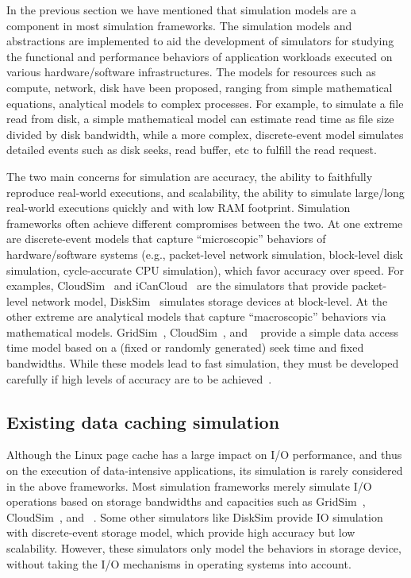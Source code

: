 In the previous section we have mentioned that simulation models are 
a component in most simulation frameworks.
The simulation models and abstractions are implemented to aid the 
development of simulators for studying the functional and performance 
behaviors of application workloads executed on various 
hardware/software infrastructures. 
The models for resources such as compute, network, disk have been proposed, 
ranging from simple mathematical equations, analytical models 
to complex processes.
For example, to simulate a file read from disk, a simple mathematical model 
can estimate read time as file size divided by disk bandwidth, 
while a more complex, discrete-event model simulates detailed events 
such as disk seeks, read buffer, etc to fulfill the read request.

The two main concerns for simulation are accuracy, the ability to 
faithfully reproduce real-world executions, and scalability, 
the ability to simulate large/long real-world executions quickly 
and with low RAM footprint. 
Simulation frameworks often achieve different compromises between the two.  
At one extreme are discrete-event models that capture
``microscopic'' behaviors of hardware/software systems (e.g.,
packet-level network simulation, block-level disk simulation,
cycle-accurate CPU simulation), which favor accuracy over speed.  
For examples, CloudSim~\cite{cloudsim} and 
iCanCloud~\cite{nunez2012icancloud} are the simulators that provide 
packet-level network model, DiskSim~\cite{bucy2003disksim} simulates 
storage devices at block-level.  
At the other extreme are analytical models that capture
``macroscopic'' behaviors via mathematical models.  
GridSim~\cite{gridsim}, CloudSim~\cite{cloudsim}, and 
\simgrid~\cite{casanova2014simgrid} provide a simple data access time 
model based on a (fixed or randomly generated) seek time and 
fixed bandwidths. 
While these models lead to fast simulation, they must be developed
carefully if high levels of accuracy are to be achieved~\cite{velhoTOMACS2013}. 

\subsection{Existing data caching simulation}

Although the Linux page cache has a large impact on I/O performance, 
and thus on the execution of data-intensive applications, 
its simulation is rarely considered in the above frameworks.  
Most simulation frameworks merely simulate I/O operations based on 
storage bandwidths and capacities such as GridSim~\cite{gridsim}, 
CloudSim~\cite{cloudsim}, and \simgrid~\cite{casanova2014simgrid}. 
Some other simulators like DiskSim provide IO simulation with 
discrete-event storage model, which provide high accuracy 
but low scalability. However, these simulators only model 
the behaviors in storage device, without taking the I/O mechanisms 
in operating systems into account. 

